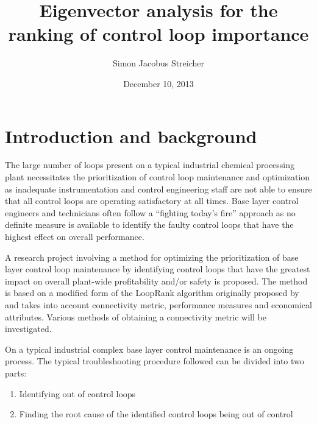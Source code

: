 \documentclass{article}
\newcommand{\subtitle}[1]{%
  \posttitle{%
    \par\end{center}
    \begin{center}\Large#1\end{center}
    \vskip0.5em}%
  }
\begin{document}


\title{Eigenvector analysis for the ranking of control loop importance}
\subtitle{Research proposal}
\date{December 10, 2013}
\author{Simon Jacobus Streicher}
\maketitle
\thispagestyle{empty}

\newpage

\tableofcontents
\thispagestyle{empty}




\newpage
{}
\pagestyle{fancy}

\section{Introduction and background}

The large number of loops present on a typical industrial chemical processing plant necessitates the prioritization of control loop maintenance and optimization as inadequate instrumentation and control engineering staff are not able to ensure that all control loops are operating satisfactory at all times.
Base layer control engineers and technicians often follow a “fighting today's fire” approach as no definite measure is available to identify the faulty control loops that have the highest effect on overall performance.

A research project involving a method for optimizing the prioritization of base layer control loop maintenance by identifying control loops that have the greatest impact on overall plant-wide profitability and/or safety is proposed.
The method is based on a modified form of the LoopRank algorithm originally proposed by \citet{Farenzena2009} and takes into account connectivity metric, performance measures and economical attributes.
Various methods of obtaining a connectivity metric will be investigated.

On a typical industrial complex base layer control maintenance is an ongoing process.
The typical troubleshooting procedure followed can be divided into two parts:
\begin{enumerate}
\item Identifying out of control loops
\item Finding the root cause of the identified control loops being out of control
\end{enumerate}
\end{document}
